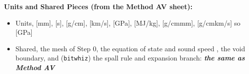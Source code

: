 \documentclass[11pt,addpoints]{exam}
\begin{document}
\clearpage

\begin{tcolorbox}[breakable]
\textbf{Units and Shared Pieces (from the Method AV sheet):}\vspace{.5em}
\begin{itemize}
\item Units, \hspace{3mm}  [mm], \hspace{2mm}  [\bm{$\mu$}s], \hspace{2mm} \bm{$\rho$} [g/cm], \hspace{2mm}  [km/s], \hspace{2mm}  [GPa], \hspace{2mm}  [MJ/kg], \hspace{2mm}  [g/cm\bm{$^3\cdot$}mm], \hspace{2mm}  [g/cm\bm{$^3\cdot$}km/s] \hspace{2mm} so  [GPa]\vspace{.5em}
\item Shared, \hspace{3mm} the mesh of Step 0, the equation of state  and sound speed , the void boundary, and (\texttt{bitwhiz}) the spall rule and expansion branch: \textbf{\emph{the same as Method AV}}
\end{itemize}
\end{tcolorbox}

\;\\
\end{document}

